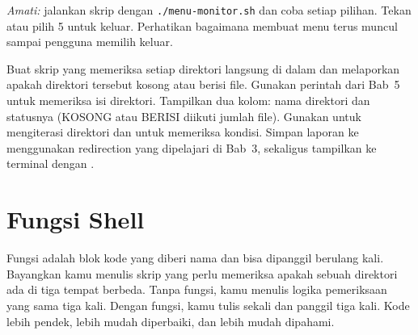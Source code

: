 \begin{enumerate}
    \textit{Amati:} jalankan skrip dengan \texttt{./menu-monitor.sh} dan
    coba setiap pilihan. Tekan  atau pilih 5 untuk
    keluar. Perhatikan bagaimana  membuat menu terus
    muncul sampai pengguna memilih keluar.
\end{enumerate}

\begin{challengebox}
Buat skrip  yang memeriksa setiap direktori langsung di
dalam  dan melaporkan apakah direktori tersebut kosong atau
berisi file. Gunakan perintah  dari Bab~5 untuk memeriksa isi
direktori. Tampilkan dua kolom: nama direktori dan statusnya (KOSONG atau
BERISI diikuti jumlah file). Gunakan  untuk mengiterasi direktori
dan  untuk memeriksa kondisi. Simpan laporan ke
 menggunakan
redirection yang dipelajari di Bab~3, sekaligus tampilkan ke terminal
dengan .
\end{challengebox}

\section{Fungsi Shell}
\label{sec:fungsi-shell-skrip}

Fungsi adalah blok kode yang diberi nama dan bisa dipanggil berulang kali.
Bayangkan kamu menulis skrip yang perlu memeriksa apakah sebuah direktori
ada di tiga tempat berbeda. Tanpa fungsi, kamu menulis logika pemeriksaan
yang sama tiga kali. Dengan fungsi, kamu tulis sekali dan panggil tiga
kali. Kode lebih pendek, lebih mudah diperbaiki, dan lebih mudah dipahami.

